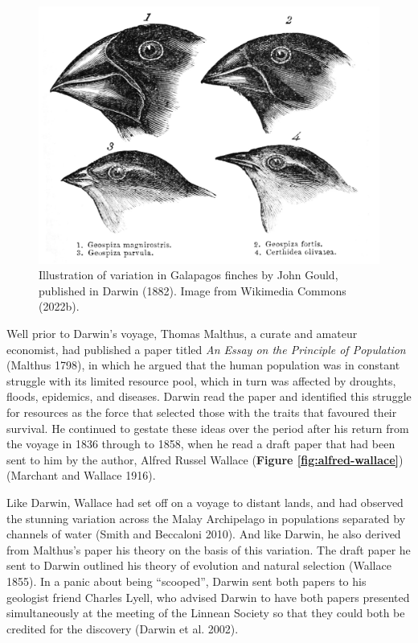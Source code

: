 \documentclass[
]{book}
\begin{document}
\begin{figure}

{\centering \includegraphics[width=1\linewidth]{figs/introduction/Darwin's_finches_by_Gould} 

}

\caption{Illustration of variation in Galapagos finches by John Gould, published in Darwin (1882). Image from Wikimedia Commons (2022b).}\label{fig:darwin-finches}
\end{figure}

Well prior to Darwin's voyage, Thomas Malthus, a curate and amateur economist, had published a paper titled \emph{An Essay on the Principle of Population} (Malthus 1798), in which he argued that the human population was in constant struggle with its limited resource pool, which in turn was affected by droughts, floods, epidemics, and diseases. Darwin read the paper and identified this struggle for resources as the force that selected those with the traits that favoured their survival. He continued to gestate these ideas over the period after his return from the voyage in 1836 through to 1858, when he read a draft paper that had been sent to him by the author, Alfred Russel Wallace (\textbf{Figure \ref{fig:alfred-wallace}}) (Marchant and Wallace 1916).

Like Darwin, Wallace had set off on a voyage to distant lands, and had observed the stunning variation across the Malay Archipelago in populations separated by channels of water (Smith and Beccaloni 2010). And like Darwin, he also derived from Malthus's paper his theory on the basis of this variation. The draft paper he sent to Darwin outlined his theory of evolution and natural selection (Wallace 1855). In a panic about being ``scooped'', Darwin sent both papers to his geologist friend Charles Lyell, who advised Darwin to have both papers presented simultaneously at the meeting of the Linnean Society so that they could both be credited for the discovery (Darwin et al. 2002).
\end{document}
